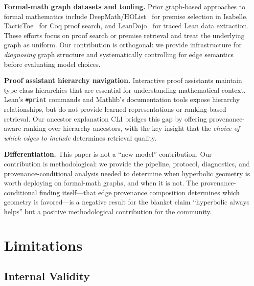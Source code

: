 \documentclass[runningheads]{llncs}
\newcommand{\enquote}[1]{``#1''}
\begin{document}
\textbf{Formal-math graph datasets and tooling.}
Prior graph-based approaches to formal mathematics include DeepMath/HOList~\cite{irving2016deepmath} for premise selection in Isabelle, TacticToe~\cite{gauthier2017tactictoe} for Coq proof search, and LeanDojo~\cite{yang2023leandojo} for traced Lean data extraction. These efforts focus on proof search or premise retrieval and treat the underlying graph as uniform. Our contribution is orthogonal: we provide infrastructure for \emph{diagnosing} graph structure and systematically controlling for edge semantics before evaluating model choices.

\textbf{Proof assistant hierarchy navigation.}
Interactive proof assistants maintain type-class hierarchies that are essential for understanding mathematical context. Lean's \texttt{\#print} commands and Mathlib's documentation tools expose hierarchy relationships, but do not provide learned representations or ranking-based retrieval. Our ancestor explanation CLI bridges this gap by offering provenance-aware ranking over hierarchy ancestors, with the key insight that the \emph{choice of which edges to include} determines retrieval quality.

\textbf{Differentiation.}
This paper is not a \enquote{new model} contribution. Our contribution is methodological: we provide the pipeline, protocol, diagnostics, and provenance-conditional analysis needed to determine when hyperbolic geometry is worth deploying on formal-math graphs, and when it is not. The provenance-conditional finding itself---that edge provenance composition determines which geometry is favored---is a negative result for the blanket claim \enquote{hyperbolic always helps} but a positive methodological contribution for the community.

\section{Limitations}

\subsection{Internal Validity}
\end{document}
